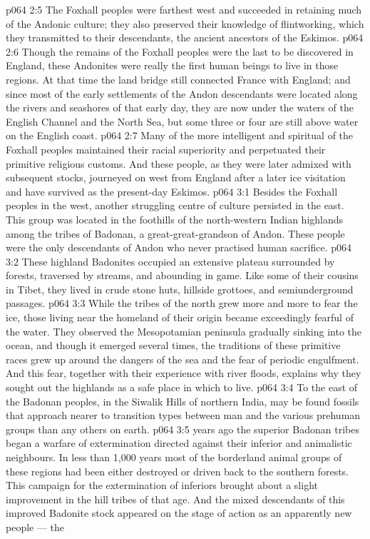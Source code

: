 \vs p064 2:5 \pc The Foxhall peoples were farthest west and succeeded in retaining much of the Andonic culture; they also preserved their knowledge of flintworking, which they transmitted to their descendants, the ancient ancestors of the Eskimos.
\vs p064 2:6 Though the remains of the Foxhall peoples were the last to be discovered in England, these Andonites were really the first human beings to live in those regions. At that time the land bridge still connected France with England; and since most of the early settlements of the Andon descendants were located along the rivers and seashores of that early day, they are now under the waters of the English Channel and the North Sea, but some three or four are still above water on the English coast.
\vs p064 2:7 Many of the more intelligent and spiritual of the Foxhall peoples maintained their racial superiority and perpetuated their primitive religious customs. And these people, as they were later admixed with subsequent stocks, journeyed on west from England after a later ice visitation and have survived as the present\hyp{}day Eskimos.
\vs p064 3:1 Besides the Foxhall peoples in the west, another struggling centre of culture persisted in the east. This group was located in the foothills of the north\hyp{}western Indian highlands among the tribes of Badonan, a great\hyp{}great\hyp{}grandson of Andon. These people were the only descendants of Andon who never practised human sacrifice.
\vs p064 3:2 These highland Badonites occupied an extensive plateau surrounded by forests, traversed by streams, and abounding in game. Like some of their cousins in Tibet, they lived in crude stone huts, hillside grottoes, and semiunderground passages.
\vs p064 3:3 While the tribes of the north grew more and more to fear the ice, those living near the homeland of their origin became exceedingly fearful of the water. They observed the Mesopotamian peninsula gradually sinking into the ocean, and though it emerged several times, the traditions of these primitive races grew up around the dangers of the sea and the fear of periodic engulfment. And this fear, together with their experience with river floods, explains why they sought out the highlands as a safe place in which to live.
\vs p064 3:4 To the east of the Badonan peoples, in the Siwalik Hills of northern India, may be found fossils that approach nearer to transition types between man and the various prehuman groups than any others on earth.
\vs p064 3:5 \pc {} years ago the superior Badonan tribes began a warfare of extermination directed against their inferior and animalistic neighbours. In less than 1,000 years most of the borderland animal groups of these regions had been either destroyed or driven back to the southern forests. This campaign for the extermination of inferiors brought about a slight improvement in the hill tribes of that age. And the mixed descendants of this improved Badonite stock appeared on the stage of action as an apparently new people --- the 
